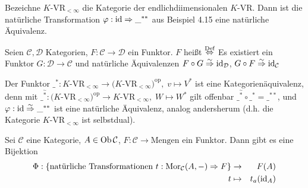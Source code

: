 \begin{bsp}
	Bezeichne $K$-VR$_{<\infty}$ die Kategorie der endlichdiimensionalen $K$-VR. Dann ist die natürliche Transformation $\varphi:\operatorname{id} \Rightarrow \_^{**}$ aus Beispiel 4.15 eine natürliche Äquivalenz.
\end{bsp}
\begin{df}\label{4.18}
	Seien $\mathcal{C}, \mathcal{D}$ Kategorien, $F:\mathcal{C} \to \mathcal{D}$ ein Funktor. $F$ heißt  $\overset{\text{Def}}{\Leftrightarrow}$ Es existiert ein Funktor $G: \mathcal{D} \to \mathcal{C}$ und natürliche Äquivalenzen $F \circ G \overset{\sim}{\Rightarrow} \operatorname{id}_{\mathcal{D}}$, $G\circ F \overset{\sim}{\Rightarrow} \operatorname{id}_{\mathcal{C}}$
\end{df}
\begin{bsp}
	Der Funktor $\_^*: K$-VR$_{<\infty} \to (K$-VR$_{<\infty})^\text{op}, \; v \mapsto V^*$ ist eine Kategorienäquivalenz, denn mit $\_^{\overset{\sim}{*}}: (K$-VR$_{<\infty})^\text{op} \to K$-VR$_{<\infty}, \; W \mapsto W^*$ gilt offenbar $\_^{\overset{\sim}{*}} \circ \_^* = \_^{**}$, und $\varphi:\operatorname{id} \overset{\sim}{\Rightarrow}  \_^{**}$ ist eine natürliche Äquivalenz, analog andersherum (d.h. die Kategorie $K$-VR$_{< \infty}$ ist selbstdual).
\end{bsp}
\begin{sa}\label{4.20}
	Sei  $\mathcal{C}$ eine Kategorie, $A\in \text{Ob}\,\mathcal{C}$, $F:\mathcal{C} \to \text{Mengen}$ ein Funktor. Dann gibt es eine Bijektion 
	\begin{eqnarray*}
	\Phi: \{\text{natürliche Transformationen }t:\text{Mor}_{\mathcal{C}}(A, -) \Rightarrow F\} & \to & F(A) \\
	t & \mapsto & t_a(\operatorname{id}_A)
	\end{eqnarray*}
\end{sa}
